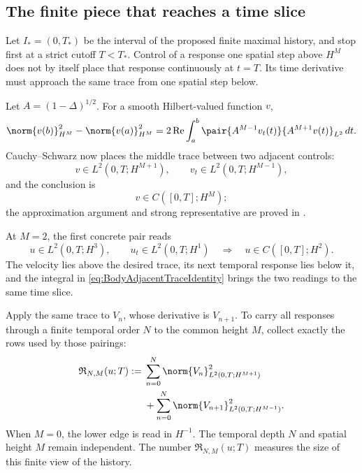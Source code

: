 \subsection{The finite piece that reaches a time slice}\label{sub:BodyFiniteAdjacentRectangles}

Let \(I_*=(0,T_*)\) be the interval of the proposed finite maximal history, and
stop first at a strict cutoff \(T<T_*\).  Control of a response one spatial
step above \(H^M\) does not by itself place that response continuously at
\(t=T\).  Its time derivative must approach the same trace from one spatial
step below.

Let \(A=(1-\Delta)^{1/2}\).  For a smooth Hilbert-valued function \(v\),
\begin{equation}\label{eq:BodyAdjacentTraceIdentity}
  \norm{v(b)}_{H^M}^2-
  \norm{v(a)}_{H^M}^2
  =2\operatorname{Re}\int_a^b
  \pair{A^{M-1}v_t(t)}{A^{M+1}v(t)}_{L^2}\,dt.
\end{equation}
Cauchy--Schwarz now places the middle trace between two adjacent controls:
\begin{equation}\label{eq:BodyAdjacentTracePair}
  v\in L^2(0,T;H^{M+1}),
  \qquad
  v_t\in L^2(0,T;H^{M-1}),
\end{equation}
and the conclusion is
\begin{equation}\label{eq:BodyAdjacentTraceConclusion}
  v\in C([0,T];H^M);
\end{equation}
the approximation argument and strong representative are proved in
.

At \(M=2\), the first concrete pair reads
\begin{equation}\label{eq:FirstConcreteAdjacentPair}
  u\in L^2(0,T;H^3),
  \qquad
  u_t\in L^2(0,T;H^1)
  \quad\Longrightarrow\quad
  u\in C([0,T];H^2).
\end{equation}
The velocity lies above the desired trace, its next temporal response lies
below it, and the integral in \eqref{eq:BodyAdjacentTraceIdentity} brings the
two readings to the same time slice.

Apply the same trace to \(V_n\), whose derivative is \(V_{n+1}\).  To carry all
responses through a finite temporal order \(N\) to the common height \(M\),
collect exactly the rows used by those pairings:
\begin{equation}\label{eq:BodyRectangleNorm}
\begin{aligned}
  \mathfrak R_{N,M}(u;T)
  :={}&
  \sum_{n=0}^{N}
  \norm{V_n}_{L^2(0,T;H^{M+1})}^2
  \\
  &+
  \sum_{n=0}^{N}
  \norm{V_{n+1}}_{L^2(0,T;H^{M-1})}^2.
\end{aligned}
\end{equation}
When \(M=0\), the lower edge is read in \(H^{-1}\).  The temporal depth
\(N\) and spatial height \(M\) remain independent.  The number
\(\mathfrak R_{N,M}(u;T)\) measures the size of this finite view of the
history.

